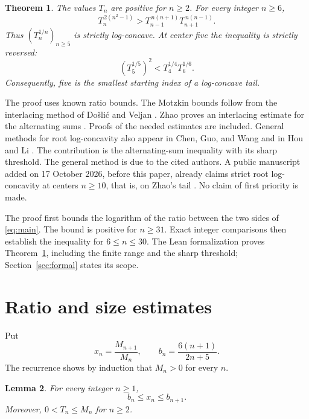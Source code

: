 \documentclass[11pt]{article}
\newtheorem{theorem}{Theorem}
\newtheorem{lemma}[theorem]{Lemma}
\begin{document}
\begin{theorem}\label{thm:main}
The values $T_n$ are positive for $n\ge2$. For every integer $n\ge6$,
\begin{equation}\label{eq:main}
T_n^{\,2(n^2-1)}>
T_{n-1}^{\,n(n+1)}T_{n+1}^{\,n(n-1)}.
\end{equation}
Thus $(T_n^{1/n})_{n\ge5}$ is strictly log-concave.
At center five the inequality is strictly reversed:
\begin{equation}\label{eq:failure}
(T_5^{1/5})^2<T_4^{1/4}T_6^{1/6}.
\end{equation}
Consequently, five is the smallest starting index of a log-concave tail.
\end{theorem}

The proof uses known ratio bounds.
The Motzkin bounds follow from the interlacing method of Do\v{s}li\'c and
Veljan \cite{DV}. Zhao proves an interlacing estimate for the alternating
sums \cite[eqs.~(7)--(8)]{Zhao}. Proofs of the needed estimates are included.
General methods for root log-concavity also appear in
Chen, Guo, and Wang \cite{CGW} and in Hou and Li \cite{HL}.
The contribution is the alternating-sum inequality with its sharp
threshold. The general method is due to the cited authors.
A public manuscript added on 17 October 2026, before this paper, already
claims strict root log-concavity at centers $n\ge10$, that is, on Zhao's
tail \cite{P}. No claim of first priority is made.

The proof first bounds the logarithm of the ratio between the two sides
of \eqref{eq:main}. The bound is positive for $n\ge31$.
Exact integer comparisons then establish the inequality for $6\le n\le30$.
The Lean formalization proves Theorem~\ref{thm:main}, including the finite
range and the sharp threshold; Section~\ref{sec:formal} states its scope.

\section{Ratio and size estimates}

Put
\[
x_n=\frac{M_{n+1}}{M_n},\qquad
b_n=\frac{6(n+1)}{2n+5}.
\]
The recurrence shows by induction that $M_n>0$ for every $n$.

\begin{lemma}\label{lem:ratios}
For every integer $n\ge1$,
\begin{equation}\label{eq:ratios}
b_n\le x_n\le b_{n+1}.
\end{equation}
Moreover, $0<T_n\le M_n$ for $n\ge2$.
\end{lemma}
\end{document}
